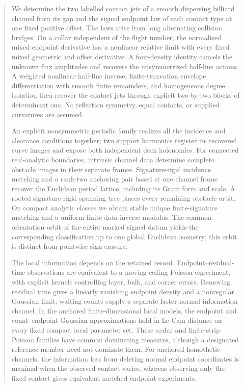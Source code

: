 \begin{abstract}
We determine the two labelled contact jets of a smooth dispersing billiard
channel from its gap and the signed endpoint law of each contact type at
one fixed positive offset.  The laws arise from long alternating collision
bridges.  On a collar independent of the flight number, the normalized
mixed endpoint derivative has a nonlinear relative limit with every fixed
mixed geometric and offset derivative.  A four-density identity cancels
the unknown flux amplitudes and recovers the unsymmetrized half-line
actions.  A weighted nonlinear half-line inverse, finite-truncation
envelope differentiation with smooth finite remainders, and homogeneous
degree isolation then recover the contact jets through explicit
two-by-two blocks of determinant one.  No reflection symmetry, equal
contacts, or supplied curvatures are assumed.

An explicit nonsymmetric periodic family realizes all the incidence and
clearance conditions together; two support harmonics register its recovered
curve images and expose both independent deck holonomies.
For connected real-analytic boundaries, intrinsic channel data determine
complete obstacle images in their separate frames.  Signature-rigid incidence
matching and a rank-two anchoring pair based at one channel frame recover
the Euclidean period lattice, including its Gram form and scale.  A rooted
signature-rigid spanning tree places every remaining obstacle orbit.  On compact analytic
classes we obtain stable unique finite-signature matching and a uniform
finite-data inverse modulus.  The common-orientation orbit of the entire
marked signed datum yields the corresponding classification up to one global
Euclidean isometry; this orbit is distinct from pointwise sign erasure.

The local information depends on the retained record.  Endpoint--residual-time
observations are equivalent to a moving-ceiling Poisson experiment, with
explicit kernels controlling layer, bulk, and corner errors.  Removing
residual time gives a linearly vanishing endpoint density and a nonregular
Gaussian limit; waiting counts supply a separate faster normal information
channel.  In the anchored finite-dimensional local models, the endpoint and
count--endpoint Gaussian approximations hold in Le Cam distance on every
fixed compact local parameter set.  These scalar and finite-strip Poisson
families have common dominating measures, although a designated reference
member need not dominate them.  For anchored homothetic channels, the
information loss from deleting normal endpoint coordinates is maximal when
the observed contact varies, whereas observing only the fixed contact gives
equivalent matched endpoint experiments.


\end{abstract}
